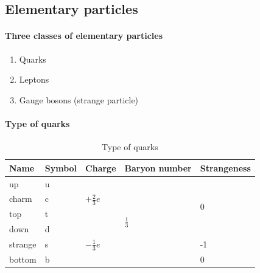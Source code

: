     \subsection{Elementary particles}
        \paragraph{Three classes of elementary particles}
            \begin{enumerate}
                \item Quarks
                \item Leptons
                \item Gauge bosons (strange particle)
            \end{enumerate}

        
        \paragraph{Type of quarks}

            \begin{table}[H]
                \begin{center}
                    \begin{tabular}{|l|l|l|l|l|}
                        \hline
                        Name & Symbol & Charge & Baryon number & Strangeness \\ \hline
                        up & u & \multirow{3}{*}{$+\frac{2}{3} e$} & \multirow{6}{*}{$\frac{1}{3}$} & \multirow{4}{*}{0} \\ \cline{1-2}
                        charm & c & & & \\ \cline{1-2}
                        top & t & & & \\ \cline{1-3}
                        down & d & \multirow{3}{*}{$-\frac{1}{3} e$} & & \\ \cline{1-2} \cline{5-5}
                        strange & s & & & -1 \\ \cline{1-2} \cline{5-5}
                        bottom & b & & & 0 \\ \hline
                    \end{tabular}
                \end{center}
                \caption{Type of quarks}
                \label{type_of_qk}
            \end{table}

